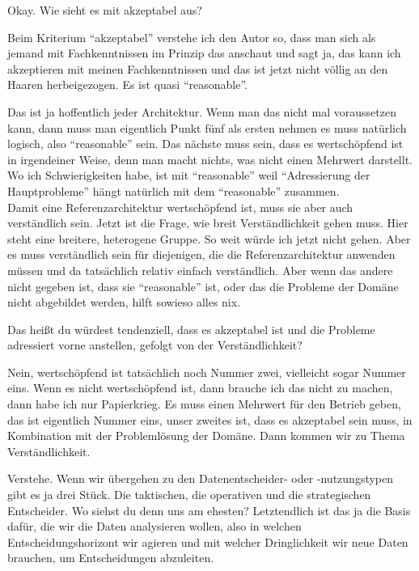 \PA	 Okay. Wie sieht es mit akzeptabel aus?

\LF	Beim Kriterium \enquote{akzeptabel} verstehe ich den Autor so, dass man sich als jemand mit Fachkenntnissen im Prinzip das anschaut und sagt ja, das kann ich akzeptieren mit meinen Fachkenntnissen und das ist jetzt nicht völlig an den Haaren herbeigezogen. Es ist quasi \enquote{reasonable}.

\PA	Das ist ja hoffentlich jeder Architektur. Wenn man das nicht mal voraussetzen kann, dann muss man eigentlich Punkt fünf als ersten nehmen es muss natürlich logisch, also \enquote{reasonable} sein. Das nächste muss sein, dass es wertschöpfend ist in irgendeiner Weise, denn man macht nichts, was nicht einen Mehrwert darstellt. Wo ich Schwierigkeiten habe, ist mit \enquote{reasonable}  weil \enquote{Adressierung der Hauptprobleme} hängt natürlich mit dem \enquote{reasonable} zusammen.\\
Damit eine Referenzarchitektur wertschöpfend ist, muss sie aber auch verständlich sein. Jetzt ist die Frage, wie breit Verständlichkeit gehen muss. Hier steht eine breitere, heterogene Gruppe. So weit würde ich jetzt nicht gehen. Aber es muss verständlich sein für diejenigen, die die Referenzarchitektur anwenden müssen und da tatsächlich relativ einfach verständlich. Aber wenn das andere nicht gegeben ist, dass sie \enquote{reasonable} ist, oder das die Probleme der Domäne nicht abgebildet werden, hilft sowieso alles nix.

\LF	 Das heißt du würdest tendenziell, dass es akzeptabel ist und die Probleme adressiert vorne anstellen, gefolgt von der Verständlichkeit?

\PA	 Nein, wertschöpfend ist tatsächlich noch Nummer zwei, vielleicht sogar Nummer eins. Wenn es nicht wertschöpfend ist, dann brauche ich das nicht zu machen, dann habe ich nur Papierkrieg. Es muss einen Mehrwert für den Betrieb geben, das ist eigentlich Nummer eins, unser zweites ist, dass es akzeptabel sein muss, in Kombination mit der Problemlösung der Domäne. Dann kommen wir zu Thema Verständlichkeit.

\LF	 Verstehe. Wenn wir übergehen zu den Datenentscheider- oder -nutzungstypen gibt es ja drei Stück.  Die taktischen, die operativen und die strategischen Entscheider. Wo siehst du denn uns am ehesten? Letztendlich ist das ja die Basis dafür, die wir die Daten analysieren wollen, also in welchen Entscheidungshorizont wir agieren und mit welcher Dringlichkeit wir neue Daten brauchen, um Entscheidungen abzuleiten.

